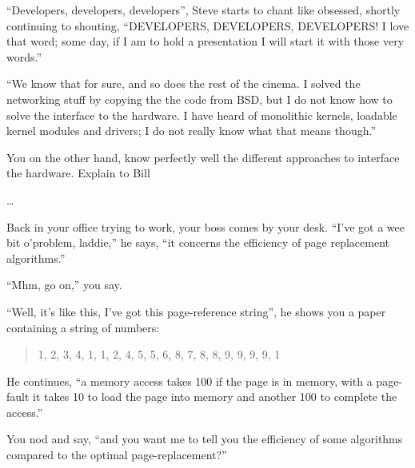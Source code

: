 \documentclass[addpoints,svv]{miunexam}
\begin{document}
\begin{questions}
  ``Developers, developers, developers'', Steve starts to chant like obsessed, 
  shortly continuing to shouting, ``DEVELOPERS, DEVELOPERS, DEVELOPERS!
  I love that word; some day, if I am to hold a presentation I will start it 
  with those very words.''

  ``We know that for sure, and so does the rest of the cinema.
  I solved the networking stuff by copying the the code from BSD, but I do not 
  know how to solve the interface to the hardware.
  I have heard of monolithic kernels, loadable kernel modules and drivers; I do 
  not really know what that means though.''

  You on the other hand, know perfectly well the different approaches to 
  interface the hardware.
  Explain to Bill
  \begin{solution}
    \dots
  \end{solution}

  \question[3]\label{q:fs}
  Back in your office trying to work, your boss comes by your desk.
  ``I've got a wee bit o'problem, laddie,'' he says, ``it concerns the 
  efficiency of page replacement algorithms.''

  ``Mhm, go on,'' you say.

  ``Well, it's like this, I've got this page-reference string'', he shows you 
  a paper containing a string of numbers:
  \begin{quote}
    1, 2, 3, 4, 1, 1, 2, 4, 5, 5, 6, 8, 7, 8, 8, 9, 9, 9, 9, 1
  \end{quote}
  He continues, ``a memory access takes \unit{100}{\nano\second} if the page is 
  in memory, with a page-fault it takes \unit{10}{\milli\second} to load the 
  page into memory and another \unit{100}{\nano\second} to complete the 
  access.''

  You nod and say, ``and you want me to tell you the efficiency of some 
  algorithms compared to the optimal page-replacement?''


\end{questions}
\end{document}
